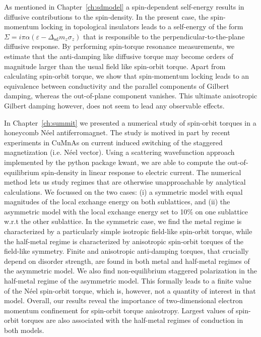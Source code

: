 As mentioned in Chapter~\ref{ch:sdmodel} a spin-dependent self-energy results in diffusive contributions to the spin-density. In the present case, the spin-momentum locking in topological insulators leads to a self-energy of the form $\Sigma = i\pi\alpha(\varepsilon-\Delta_\text{sd} m_z \sigma_z)$ that is responsible to the perpendicular-to-the-plane diffusive response. By performing spin-torque resonance measurements, we estimate that the anti-damping like diffusive torque may become orders of magnitude larger than the usual field like spin-orbit torque. Apart from calculating spin-orbit torque, we show that spin-momentum locking leads to an equivalence between conductivity and the parallel components of Gilbert damping, whereas the out-of-plane component vanishes. This ultimate anisotropic Gilbert damping however, does not seem to lead any observable effects. 

In Chapter~\ref{ch:summit} we presented a numerical study of spin-orbit torques in a honeycomb N\'eel antiferromagnet. The study is motived in part by recent experiments in CuMnAs on current induced switching of the staggered magnetization (i.e. N\'eel vector). Using a scattering wavefunction approach implemented by the python package kwant, we are able to compute the out-of-equilibrium spin-density in linear response to electric current. The numerical method lets us study regimes that are otherwise unapproachable by analytical calculations. We focussed on the two cases: (i) a symmetric model with equal magnitudes of the local exchange energy on both sublattices, and (ii) the asymmetric model with the local exchange energy set to 10\% on one sublattice w.r.t the other sublattice. In the symmetric case, we find the metal regime is characterized by a particularly simple isotropic field-like spin-orbit torque, while the half-metal regime is characterized by anisotropic spin-orbit torques of the field-like symmetry.  Finite and anisotropic anti-damping torques, that crucially depend on disorder strength, are found in both metal and half-metal regimes of the asymmetric model. We also find non-equilibrium staggered polarization in the half-metal regime of the asymmetric model. This formally leads to a finite value of the N\'eel spin-orbit torque, which is, however, not a quantity of interest in that model. Overall, our results reveal the importance of two-dimensional electron momentum confinement for spin-orbit torque anisotropy. Largest values of spin-orbit torques are also associated with the half-metal regimes of conduction in both models. 

